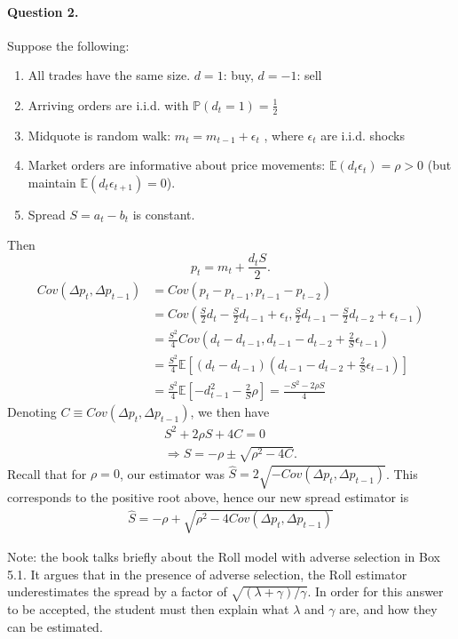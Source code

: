 \documentclass[a4paper]{article}
\begin{document}
	\paragraph{Question 2.}
	Suppose the following:
	\begin{enumerate}
		\item All trades have the same size. $d=1$: buy, $d=-1$: sell
		\item Arriving orders are i.i.d. with $\mathbb{P}(d_t =1)=\frac{1}{2}$
		\item Midquote is random walk: $m_t = m_{t-1} + \epsilon_t$  , where $\epsilon_t$ are i.i.d. shocks
		\item Market orders are informative about price movements: $\mathbb{E}(d_t \epsilon_{t})=\rho > 0$ (but maintain $\mathbb{E}(d_t \epsilon_{t+1})=0$).
		\item Spread $S = a_t-b_t$ is constant.
	\end{enumerate}
	Then
	\[
	p_t = m_t + \frac{d_t S}{2}.
	\]
	\begin{align*}
		Cov(\Delta p_t, \Delta p_{t-1}) 
		&= Cov(p_t-p_{t-1}, p_{t-1}-p_{t-2})
		\\
		&=Cov \left( \frac{S}{2}d_t - \frac{S}{2}d_{t-1} + \epsilon_t, \frac{S}{2}d_{t-1} - \frac{S}{2}d_{t-2} + \epsilon_{t-1} \right)
		\\
		&= \frac{S^2}{4} Cov \left( d_t-d_{t-1}, d_{t-1}-d_{t-2} + \frac{2}{S}\epsilon_{t-1} \right)
		\\
		&= \frac{S^2}{4} \mathbb{E}\left[\left( d_t-d_{t-1} \right) \left( d_{t-1}-d_{t-2} + \frac{2}{S} \epsilon_{t-1} \right) \right]
		\\
		&= \frac{S^2}{4} \mathbb{E} \left[ -d_{t-1}^2 - \frac{2}{S} \rho \right] = \frac{-S^2 - 2 \rho S}{4}
	\end{align*}
	Denoting $C \equiv Cov(\Delta p_t, \Delta p_{t-1})$, we then have
	\begin{align*}
		S^2 + 2\rho S + 4C = 0
		\\ \Rightarrow 
		S = -\rho \pm \sqrt{ \rho^2 - 4C }.
	\end{align*}
	Recall that for $\rho=0$, our estimator was $\hat{S} = 2 \sqrt{-Cov(\Delta p_t, \Delta p_{t-1})}$. This corresponds to the positive root above, hence our new spread estimator is
	\begin{align*}
		\hat{S} = -\rho + \sqrt{ \rho^2 - 4Cov(\Delta p_t, \Delta p_{t-1}) }
	\end{align*}
	
	
	Note: the book talks briefly about the Roll model with adverse selection in Box 5.1. It argues that in the presence of adverse selection, the Roll estimator underestimates the spread by a factor of $\sqrt{(\lambda+\gamma)/\gamma}$. In order for this answer to be accepted, the student must then explain what $\lambda$ and $\gamma$ are, and how they can be estimated.
	
\end{document}
